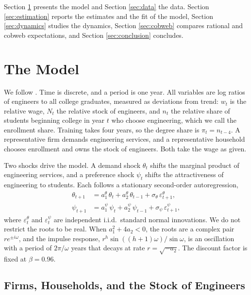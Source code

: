 \documentclass[12pt]{article}
\begin{document}
Section \ref{sec:model} presents the model and Section \ref{sec:data} the data. Section \ref{sec:estimation} reports the estimates and the fit of the model, Section \ref{sec:dynamics} studies the dynamics, Section \ref{sec:cobweb} compares rational and cobweb expectations, and Section \ref{sec:conclusion} concludes.

\section{The Model}\label{sec:model}

We follow \citet{ryoo2004engineering}. Time is discrete, and a period is one year. All variables are log ratios of engineers to all college graduates, measured as deviations from trend: $w_t$ is the relative wage, $N_t$ the relative stock of engineers, and $n_t$ the relative share of students beginning college in year $t$ who choose engineering, which we call the enrollment share. Training takes four years, so the degree share is $\pi_t = n_{t-4}$. A representative firm demands engineering services, and a representative household chooses enrollment and owns the stock of engineers. Both take the wage as given.

Two shocks drive the model. A demand shock $\theta_t$ shifts the marginal product of engineering services, and a preference shock $\psi_t$ shifts the attractiveness of engineering to students. Each follows a stationary second-order autoregression,
\begin{align}
  \theta_{t+1} &= a^{\theta}_{1}\,\theta_t + a^{\theta}_{2}\,\theta_{t-1} + \sigma_{\theta}\,\varepsilon^{\theta}_{t+1}, \label{eq:theta}\\
  \psi_{t+1}   &= a^{\psi}_{1}\,\psi_t + a^{\psi}_{2}\,\psi_{t-1} + \sigma_{\psi}\,\varepsilon^{\psi}_{t+1}, \label{eq:psi}
\end{align}
where $\varepsilon^{\theta}_t$ and $\varepsilon^{\psi}_t$ are independent i.i.d.\ standard normal innovations. We do not restrict the roots to be real. When $a_1^{2}+4a_2<0$, the roots are a complex pair $re^{\pm i\omega}$, and the impulse response, $r^{h}\sin((h+1)\omega)/\sin\omega$, is an oscillation with a period of $2\pi/\omega$ years that decays at rate $r=\sqrt{-a_2}$. The discount factor is fixed at $\beta = 0.96$.

\subsection{Firms, Households, and the Stock of Engineers}\label{sec:agents}
\end{document}
